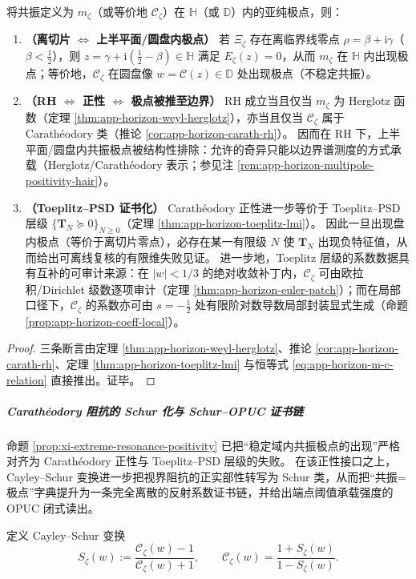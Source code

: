 \begin{proposition}[极端共振的正性判别与有限维失败见证]\label{prop:xi-extreme-resonance-positivity}
将共振定义为 \(m_{\zeta}\)（或等价地 \(\mathscr{C}_{\zeta}\)）在 \(\mathbb{H}\)（或 \(\mathbb{D}\)）内的亚纯极点，则：
\begin{enumerate}
  \item \textbf{（离切片 \texorpdfstring{$\Longleftrightarrow$}{<->} 上半平面/圆盘内极点）}
  若 \(\Xi_{\zeta}\) 存在离临界线零点 \(\rho=\beta+\mathrm{i}\gamma\)（\(\beta<\tfrac12\)），则
  \(z=\gamma+\mathrm{i}(\tfrac12-\beta)\in\mathbb{H}\) 满足 \(E_{\zeta}(z)=0\)，从而 \(m_{\zeta}\) 在 \(\mathbb{H}\) 内出现极点；等价地，\(\mathscr{C}_{\zeta}\) 在圆盘像 \(w=\mathcal{C}(z)\in\mathbb{D}\) 处出现极点（不稳定共振）。
  \item \textbf{（RH \texorpdfstring{$\Longleftrightarrow$}{<->} 正性 \texorpdfstring{$\Longleftrightarrow$}{<->} 极点被推至边界）}
  RH 成立当且仅当 \(m_{\zeta}\) 为 Herglotz 函数（定理 \ref{thm:app-horizon-weyl-herglotz}），亦当且仅当 \(\mathscr{C}_{\zeta}\) 属于 Carath\'eodory 类（推论 \ref{cor:app-horizon-carath-rh}）。
  因而在 RH 下，上半平面/圆盘内共振极点被结构性排除：允许的奇异只能以边界谱测度的方式承载（Herglotz/Carath\'eodory 表示；参见注 \ref{rem:app-horizon-multipole-positivity-hair}）。
  \item \textbf{（Toeplitz--PSD 证书化）}
  Carath\'eodory 正性进一步等价于 Toeplitz--PSD 层级 \(\{\mathbf{T}_N\succeq 0\}_{N\ge 0}\)（定理 \ref{thm:app-horizon-toeplitz-lmi}）。
  因此一旦出现盘内极点（等价于离切片零点），必存在某一有限级 \(N\) 使 \(\mathbf{T}_N\) 出现负特征值，从而给出可离线复核的有限维失败见证。
  进一步地，Toeplitz 层级的系数数据具有互补的可审计来源：在 \(|w|<1/3\) 的绝对收敛补丁内，\(\mathscr{C}_{\zeta}\) 可由欧拉积/Dirichlet 级数逐项审计（定理 \ref{thm:app-horizon-euler-patch}）；而在局部口径下，\(\mathscr{C}_{\zeta}\) 的系数亦可由 \(s=-\tfrac12\) 处有限阶对数导数局部封装显式生成（命题 \ref{prop:app-horizon-coeff-local}）。
\end{enumerate}
\end{proposition}

\begin{proof}
三条断言由定理 \ref{thm:app-horizon-weyl-herglotz}、推论 \ref{cor:app-horizon-carath-rh}、定理 \ref{thm:app-horizon-toeplitz-lmi} 与恒等式 \eqref{eq:app-horizon-m-c-relation} 直接推出。证毕。
\end{proof}

\subparagraph{Carath\'eodory 阻抗的 Schur 化与 Schur--OPUC 证书链}
命题 \ref{prop:xi-extreme-resonance-positivity} 已把“稳定域内共振极点的出现”严格对齐为 Carath\'eodory 正性与 Toeplitz--PSD 层级的失败。
在该正性接口之上，Cayley--Schur 变换进一步把视界阻抗的正实部性转写为 Schur 类，从而把“共振=极点”字典提升为一条完全离散的反射系数证书链，并给出端点阈值承载强度的 OPUC 闭式读出。
\par
定义 Cayley--Schur 变换
\begin{equation}\label{eq:xi-horizon-cayley-schur}
\boxed{\;
S_{\zeta}(w):=\frac{\mathscr{C}_{\zeta}(w)-1}{\mathscr{C}_{\zeta}(w)+1},
\qquad
\mathscr{C}_{\zeta}(w)=\frac{1+S_{\zeta}(w)}{1-S_{\zeta}(w)}.\;}
\end{equation}

